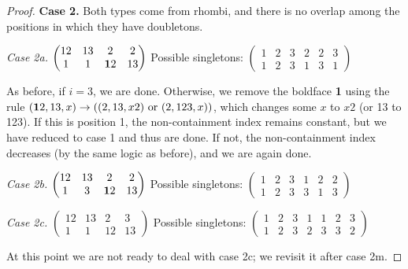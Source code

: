 \documentclass[11pt]{amsart}
\begin{document}
\begin{proof}
\smallskip


\textbf{Case 2.} Both types come from rhombi, and there is no overlap among the positions in which they have doubletons.

\textit{Case 2a.}
$\begin{pmatrix}
12 & 13 & 2 & 2\\
1 & 1 & {\bf 1}2 & 13 
\end{pmatrix}$
Possible singletons: 
$\begin{pmatrix}
1 & 2 & 3 & 2 & 2 & 3\\
1 & 2 & 3 & 1 & 3 & 1
\end{pmatrix}$

As before, if $i=3$, we are done. Otherwise, we remove the boldface {\bf 1} using the rule $({\bf 1}2,13,x) \rightarrow ((2,13,x2) \textrm{ or } (2,123,x))$, which changes some $x$ to $x2$ (or 13 to 123). If this is position 1, the non-containment 
index remains constant, but we have reduced to case 1 and thus are done. If not, the non-containment index decreases (by the same logic as 
before), and we are again done.

\textit{Case 2b.}
$\begin{pmatrix}
12 & 13 & 2 & 2\\
1 & 3 & {\bf 1}2 & 13 
\end{pmatrix}$
Possible singletons: 
$\begin{pmatrix}
1 & 2 & 3 & 1 & 2 & 2\\
1 & 2 & 3 & 3 & 1 & 3
\end{pmatrix}$

\smallskip

\textit{Case 2c.}
$\begin{pmatrix}
12 & 13 & 2 & 3\\
1 & 1 & 12 & 13 
\end{pmatrix}$
Possible singletons: 
$\begin{pmatrix}
1 & 2 & 3 & 1 & 1 & 2 & 3\\
1 & 2 & 3 & 2 & 3 & 3 & 2
\end{pmatrix}$

At this point we are not ready to deal with case 2c; we revisit it after case 2m.



\end{proof}
\end{document}
